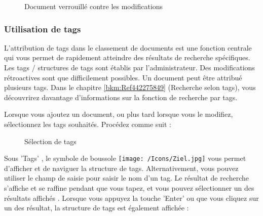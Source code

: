 \begin{figure}[H]
\caption{Document verrouillé contre les modifications}
\end{figure}

\subsubsection{Utilisation de tags}
\label{bkm:Ref201801219}

L'attribution de tags dans le classement de documents est une fonction centrale qui vous permet de rapidement atteindre des résultats de recherche spécifiques. Les tags / structures de tags sont établis par l'administrateur. Des modifications rétroactives sont que difficilement possibles. Un document peut être attribué plusieurs tags. Dans le chapitre \ref{bkm:Ref442275849} (Recherche selon tags), vous découvrirez davantage d'informations sur la fonction de recherche par tags. \newline

\vspace{\baselineskip}

Lorsque vous ajoutez un document, ou plus tard lorsque vous le modifiez, sélectionnez les tags souhaités. Procédez comme suit : 

\begin{figure}[H]
\caption{Sélection de tags}
\end{figure}

Sous 'Tags' , le symbole de boussole \texttt{[image: /Icons/Ziel.jpg]}  vous permet d'afficher et de naviguer la structure de tags. Alternativement, vous pouvez utiliser le champ de saisie  pour saisir le nom d'un tag. Le résultat de recherche s'affiche et se raffine pendant que vous tapez, et vous pouvez sélectionner un des résultats affichés . Lorsque vous appuyez la touche 'Enter' ou que vous cliquez sur un des résultat, la structure de tags est également affichée :

